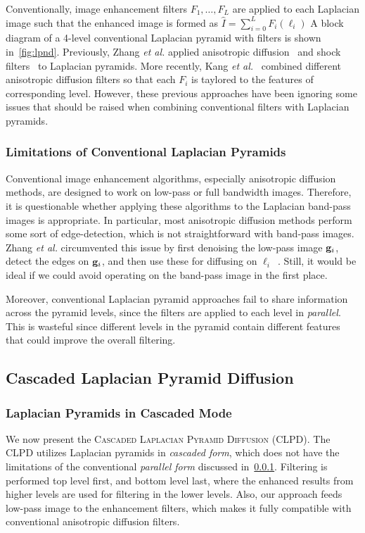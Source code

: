 Conventionally, image enhancement filters \(F_1, \ldots, F_L\) are applied to each Laplacian image such that the enhanced image is formed as \(\widehat{I} = \sum_{i=0}^L F_i\left({\boldsymbol\ell}_{i}\right) \)
A block diagram of a 4-level conventional Laplacian pyramid with filters is shown in~\cref{fig:lpnd}.
Previously, Zhang \textit{et al.} applied anisotropic diffusion~\cite{perona_scalespace_1990} and shock filters~\cite{zhang_multiscale_2006} to Laplacian pyramids.
More recently, Kang \textit{et al.}~\cite{kang_new_2016} combined different anisotropic diffusion filters so that each \(F_i\) is taylored to the features of corresponding level.
However, these previous approaches have been ignoring some issues that should be raised when combining conventional filters with Laplacian pyramids.

\subsubsection{Limitations of Conventional Laplacian Pyramids}\label{section:limitations}
Conventional image enhancement algorithms, especially anisotropic diffusion methods, are designed to work on low-pass or full bandwidth images.
Therefore, it is questionable whether applying these algorithms to the Laplacian band-pass images is appropriate.
In particular, most anisotropic diffusion methods perform some sort of edge-detection, which is not straightforward with band-pass images.
Zhang \textit{et al.} circumvented this issue by first denoising the low-pass image \(\mathbf{g}_{i}\), detect the edges on \(\mathbf{g}_{i}\), and then use these for diffusing on \({\boldsymbol\ell}_{i}\)~\cite{zhang_multiscale_2006}.
Still, it would be ideal if we could avoid operating on the band-pass image in the first place.

Moreover, conventional Laplacian pyramid approaches fail to share information across the pyramid levels, since the filters are applied to each level in \textit{parallel}.
This is wasteful since different levels in the pyramid contain different features that could improve the overall filtering.

\subsection{Cascaded Laplacian Pyramid Diffusion}
\subsubsection{Laplacian Pyramids in Cascaded Mode}
We now present the \textsc{Cascaded Laplacian Pyramid Diffusion} (CLPD).
The CLPD utilizes Laplacian pyramids in \textit{cascaded form}, which does not have the limitations of the conventional \textit{parallel form} discussed in~\cref{section:limitations}.
Filtering is performed top level first, and bottom level last, where the enhanced results from higher levels are used for filtering in the lower levels.
Also, our approach feeds low-pass image to the enhancement filters, which makes it fully compatible with conventional anisotropic diffusion filters.

